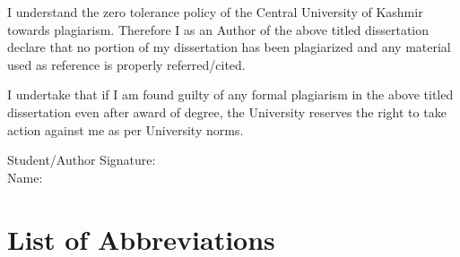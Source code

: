 \documentclass[12pt,a4paper]{report}
\begin{document}
I understand the zero tolerance policy of the Central University of Kashmir towards plagiarism. Therefore I as an Author of the above titled dissertation declare that no portion of my dissertation has been plagiarized and any material used as reference is properly referred/cited.

I undertake that if I am found guilty of any formal plagiarism in the above titled dissertation even after award of degree, the University reserves the right to take action against me as per University norms.

\vspace{2cm}

\noindent Student/Author Signature:\underline{\hspace{5cm}}\\[0.5cm]
Name:\underline{\hspace{6cm}}
\endgroup

\clearpage

\chapter*{List of Abbreviations}
\begingroup
\singlespacing
\end{document}
